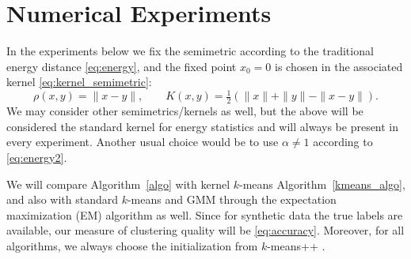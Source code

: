 \documentclass[aps,preprint,nofootinbib,floatfix]{revtex4-1}
\newcommand\kk{K}
\begin{document}
\section{Numerical Experiments}
\label{sec:numerics}

In the experiments below we fix the semimetric 
according to the traditional energy distance \eqref{eq:energy}, and
the fixed point $x_0=0$ is chosen in the associated kernel  
\eqref{eq:kernel_semimetric}:
\begin{equation}
\rho(x,y) = \| x-y\|, \qquad \kk(x,y) = 
\tfrac{1}{2}\left( \| x \| + \| y \| - \| x-y \| \right).
\end{equation}
We may consider other semimetrics/kernels as well, 
but the above will be considered the
standard kernel for energy statistics and will always be present in every
experiment. Another usual choice would be
to use $\alpha\ne 1$ according to \eqref{eq:energy2}.

We will compare Algorithm~\ref{algo} with
kernel $k$-means Algorithm~\ref{kmeans_algo}, and also with
standard $k$-means and GMM through the expectation maximization (EM) 
algorithm
as well. Since for synthetic data the true labels are available,
our measure of clustering quality
will be \eqref{eq:accuracy}. Moreover, for all algorithms, we always
choose the initialization from $k$-means++ \cite{Vassilvitskii}.
\end{document}
